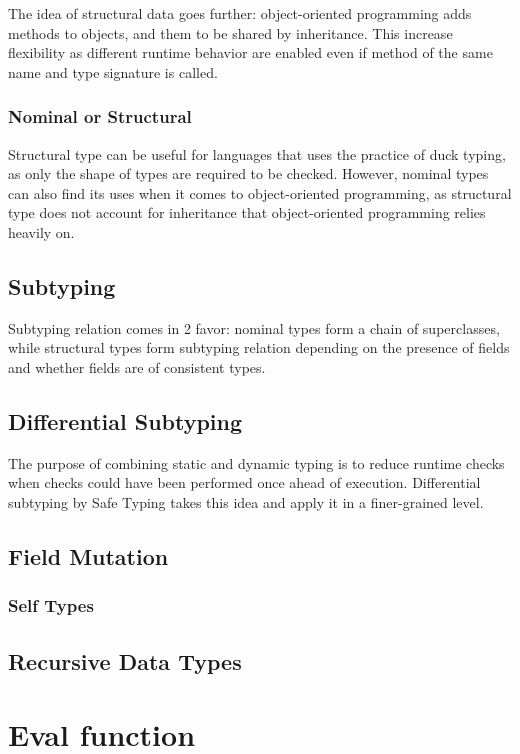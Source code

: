 The idea of structural data goes further: object-oriented programming adds methods to objects,
and them to be shared by inheritance.
This increase flexibility as different runtime behavior are enabled even if method of the same name and type signature is called.

\subsubsection{Nominal or Structural}

Structural type can be useful for languages that uses the practice of duck typing, as only the shape of types are required to be checked.
However, nominal types can also find its uses when it comes to object-oriented programming,
as structural type does not account for inheritance that object-oriented programming relies heavily on.

\subsection{Subtyping}

Subtyping relation comes in 2 favor: nominal types form a chain of superclasses,
while structural types form subtyping relation depending on the presence of fields and whether
fields are of consistent types.

\subsection{Differential Subtyping}

The purpose of combining static and dynamic typing is to reduce
runtime checks when checks could have been performed once ahead of execution.
Differential subtyping by Safe Typing takes this idea and apply it in a finer-grained level.

\subsection{Field Mutation}

\subsubsection{Self Types}

\subsection{Recursive Data Types}

\section{Eval function}

